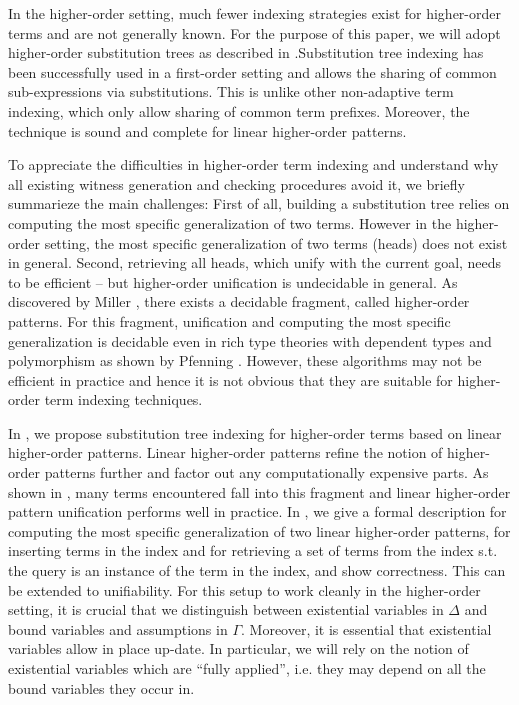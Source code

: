 \documentclass{acmconf}
\begin{document}
In the higher-order setting, much fewer indexing strategies exist for
higher-order terms and are not generally known. For the purpose of
this paper, we will adopt higher-order substitution trees as described
in \cite{Pientka:ICLP03}.Substitution tree indexing has been
successfully used in a first-order setting \cite{graf:substtrees} and
allows the sharing of common sub-expressions via substitutions. This
is unlike other non-adaptive term indexing, which only allow sharing
of common term prefixes. Moreover, the technique is sound and complete
for linear higher-order patterns.

To appreciate the difficulties in higher-order term indexing and
understand why all existing witness generation and checking procedures
avoid it, we briefly summarieze the main challenges:
 First of all, building a substitution tree relies on computing the
 most specific generalization of two terms. However in the
 higher-order setting, the most specific generalization of two terms (heads)
 does not exist in general. Second, retrieving all heads, which unify
 with the current goal, needs to be efficient --
but higher-order unification is undecidable in general.  As discovered
by Miller \cite{Miller91iclp}, there exists a decidable fragment,
called higher-order patterns. For this fragment, unification and
computing the most specific generalization is decidable even in 
rich type theories with dependent types and polymorphism as shown by
Pfenning \cite{Pfenning91lics}.  However, these algorithms may not be
efficient in practice  \cite{PientkaPfenning:CADE03} and hence it is
not obvious that they are suitable for higher-order term
indexing techniques. 

In \cite{Pientka:ICLP02}, we propose substitution tree indexing for
higher-order terms based on linear higher-order patterns. Linear
higher-order patterns refine the notion of higher-order patterns
further and factor out any computationally expensive parts. As shown
in \cite{PientkaPfenning:CADE03}, many terms encountered fall into
this fragment and linear higher-order pattern unification performs well in
practice. In \cite{Pientka:ICLP02,Pientka:Phd}, we give a formal
description for computing the most specific generalization of two
linear higher-order patterns, for inserting terms in the index and for
retrieving a set of terms from the index s.t. the query is an instance
of the term in the index, and show correctness. This can be extended
to unifiability. For this setup to work cleanly in the higher-order
setting, it is crucial that we distinguish between existential
variables in $\Delta$ and bound variables and assumptions in
$\Gamma$. Moreover, it is essential that existential variables allow
in place up-date. In particular, we will rely on the notion of
existential variables which are ``fully applied'', i.e. they may
depend on all the bound variables they occur in.
\end{document}
